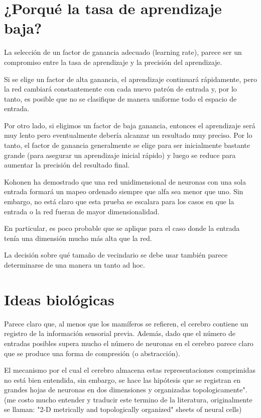 \documentclass[fleqn, journal, onecolumn]{IEEEtran}             %
\theoremstyle{break}                                            %
\begin{document}
  \section{¿Porqué la tasa de aprendizaje baja?}

    La selección de un factor de ganancia adecuado (learning rate), parece ser un compromiso entre la
    tasa de aprendizaje y la precisión del aprendizaje. 
    
    Si se elige un factor de alta ganancia, el aprendizaje continuará rápidamente, 
    pero la red cambiará constantemente con cada nuevo patrón de entrada y, por lo tanto, 
    es posible que no se clasifique de manera uniforme todo el espacio de entrada. 
    
    Por otro lado, si eligimos un factor de baja ganancia, entonces el 
    aprendizaje será muy lento pero eventualmente debería alcanzar un resultado muy preciso. 
    Por lo tanto, el factor de ganancia generalmente se elige para ser inicialmente bastante
    grande (para asegurar un aprendizaje inicial rápido) y luego se reduce para aumentar la
    precisión del resultado final.

    Kohonen ha demostrado que una red unidimensional de neuronas con una sola entrada formará 
    un mapeo ordenado siempre que alfa sea menor que uno. 
    Sin embargo, no está claro que esta prueba se escalara para los casos en que la entrada o 
    la red fueran de mayor dimensionalidad. 
    
    En particular, es poco probable que se aplique para el caso donde la entrada tenía una 
    dimensión mucho más alta que la red. 

    La decisión sobre qué tamaño de vecindario se debe usar también parece determinarse de 
    una manera un tanto ad hoc.

  \section{Ideas biológicas}

    Parece claro que, al menos que los mamíferos se refieren, el 
    cerebro contiene un registro de la información sensorial previa. 
    Además, dado que el número de entradas posibles supera mucho el número de 
    neuronas en el cerebro parece claro que se produce una forma de compresión (o abstracción). 
    
    El mecanismo por el cual el cerebro almacena estas representaciones comprimidas no está 
    bien entendida, sin embargo, se hace las hipótesis que se registran en grandes hojas
    de neuronas en dos dimensiones y organizadas topologicamente". (me costo mucho entender y traducir
    este termino de la literatura, originalmente se llaman:  "2-D
    metrically and topologically organized" sheets of neural cells)
    
\end{document}

